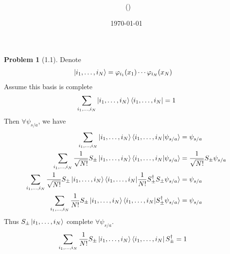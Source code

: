 \documentclass[twoside,11pt]{article}
\title{{\lms \Code \ \Ass}}
\author{\lms \name \ (\href{mailto:\mail}{\mail})}
\date{\sffamily \today}
\makeatletter
\theoremstyle{definition}
\newtheorem{problem}{Problem}
\theoremstyle{remark}
\newtheorem*{remark}{Remark}
\renewcommand{\maketitle}{\bgroup\setlength{\parindent}{0pt}
\begin{flushleft}
  \textbf{\Large\@title}

  \@author
\end{flushleft}\egroup
}
\makeatother
\begin{document}
\maketitle
\thispagestyle{title}


\begin{problem}[1.1]
Denote
\begin{align*}
    \ket{i_1,\dots,i_N} &= 
    \varphi_{i_1}(x_1)\cdots\varphi_{i_N}(x_N)
\end{align*}
Assume this basis is complete
\begin{align*}
    \sum_{i_1,\dots,i_N}
    \ket{i_1,\dots,i_N}
    \bra{i_1,\dots,i_N} = 1
\end{align*}
Then $\forall \psi_{s/a}$, we have
\begin{align*} 
    \sum_{i_1,\dots,i_N}
    \ket{i_1,\dots,i_N}
    \braket{i_1,\dots,i_N|\psi_{s/a}} &= \psi_{s/a}\\
    \sum_{i_1,\dots,i_N}
    \frac{1}{\sqrt{N!}}S_\pm\ket{i_1,\dots,i_N}
    \braket{i_1,\dots,i_N|\psi_{s/a}} 
    &= \frac{1}{\sqrt{N!}}S_\pm\psi_{s/a}\\
    \sum_{i_1,\dots,i_N}
    \frac{1}{\sqrt{N!}}S_\pm\ket{i_1,\dots,i_N}
    \braket{i_1,\dots,i_N|\frac{1}{N!}
    S_\pm^\dagger S_\pm\psi_{s/a}}
    &= \psi_{s/a}\\
    \sum_{i_1,\dots,i_N}
    \frac{1}{N!}S_\pm\ket{i_1,\dots,i_N}
    \braket{i_1,\dots,i_N|S_\pm^\dagger\psi_{s/a}}
    &= \psi_{s/a}
\end{align*}
Thus $S_\pm\ket{i_1,\dots,i_N}$ complete $\forall \psi_{s/a}$.
\begin{align*}
    \sum_{i_1,\dots,i_N}
    \frac{1}{N!}S_\pm\ket{i_1,\dots,i_N}
    \bra{i_1,\dots,i_N}S_\pm^\dagger
    &= 1
\end{align*}

\end{problem}
\end{document}

